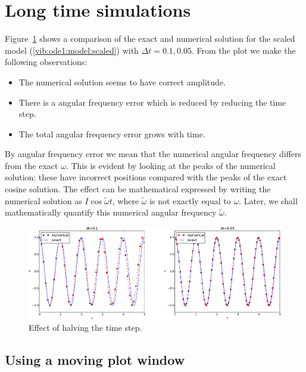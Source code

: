 \documentclass[%
oneside,                 %
final,                   %
10pt]{article}
\begin{document}
\section{Long time simulations}
\label{vib:ode1:longseries}

Figure~\ref{vib:ode1:2dt} shows a comparison of the exact and numerical
solution for the scaled model (\ref{vib:ode1:model:scaled}) with
$\Delta t=0.1, 0.05$.
From the plot we make the following observations:

\begin{itemize}
 \item The numerical solution seems to have correct amplitude.

 \item There is a angular frequency error which is reduced by reducing the time step.

 \item The total angular frequency error grows with time.
\end{itemize}

\noindent
By angular frequency error we mean that the numerical angular frequency differs
from the exact $\omega$. This is evident by looking
at the peaks of the numerical solution: these have incorrect
positions compared with the peaks of the exact cosine solution. The
effect can be mathematical expressed by writing the numerical solution
as $I\cos\tilde\omega t$, where $\tilde\omega$ is not exactly
equal to $\omega$. Later, we shall mathematically
quantify this numerical angular frequency $\tilde\omega$.


\begin{figure}[!ht]  %
  \centerline{\includegraphics[width=1.0\linewidth]{fig-vib/vib_freq_err1.pdf}}
  \caption{
  Effect of halving the time step. \label{vib:ode1:2dt}
  }
\end{figure}


\subsection{Using a moving plot window}
\end{document}
